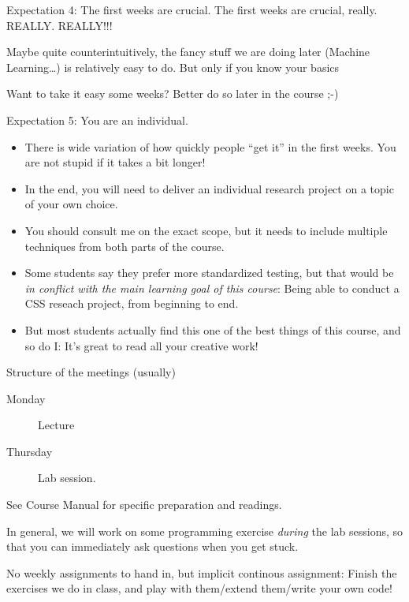 \begin{frame}{Expectation 4: The first weeks are crucial.}
The first weeks are crucial, really. REALLY. REALLY!!!

Maybe quite counterintuitively, the fancy stuff we are doing later (Machine Learning\ldots) is relatively easy to do. But only if you know your basics %

Want to take it easy some weeks? Better do so later in the course ;-)
\end{frame}






\begin{frame}{Expectation 5: You are an individual.}
\begin{itemize}
	\item There is wide variation of how quickly people ``get it'' in the first weeks. You are not stupid if it takes a bit longer!
	\item In the end, you will need to deliver an individual research project on a topic of your own choice.
	\item You should consult me on the exact scope, but it needs to include multiple techniques from both parts of the course.
	\item Some students say they prefer more standardized testing, but that would be \emph{in conflict with the main learning goal of this course}: Being able to conduct a CSS reseach project, from beginning to end.
	\item But most students actually find this one of the best things of this course, and so do I: It's great to read all your creative work!
\end{itemize}

\end{frame}


\begin{frame}{Structure of the meetings (usually)}
	\begin{description}
		\item[Monday] Lecture
		\item[Thursday]Lab session.
	\end{description}
See Course Manual for specific preparation and readings.

In general, we will work on some programming exercise \emph{during} the lab sessions, so that you can immediately ask questions when you get stuck.

No weekly assignments to hand in, but implicit continous assignment: Finish the exercises we do in class, and play with them/extend them/write your own code!
\end{frame}

